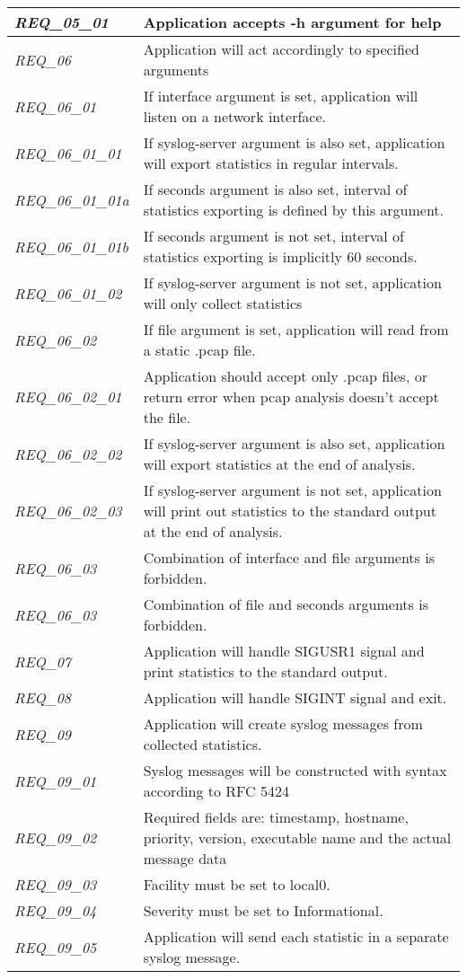 \begin{table}[H]
{\begin{tabular}{@{}|l|l|@{}}
\textit{REQ\_05\_01} & Application accepts -h argument for help \\ \midrule
\textit{REQ\_06} & Application will act accordingly to specified arguments \\ \midrule
\textit{REQ\_06\_01} & If interface argument is set, application will listen on a network interface. \\ \midrule
\textit{REQ\_06\_01\_01} & If syslog-server argument is also set, application will export statistics in regular intervals. \\ \midrule
\textit{REQ\_06\_01\_01a} & If seconds argument is also set, interval of statistics exporting is defined by this argument. \\ \midrule
\textit{REQ\_06\_01\_01b} & If seconds argument is not set, interval of statistics exporting is implicitly 60 seconds. \\ \midrule
\textit{REQ\_06\_01\_02} & If syslog-server argument is not set, application will only collect statistics \\ \midrule
\textit{REQ\_06\_02} & If file argument is set, application will read from a static .pcap file. \\ \midrule
\textit{REQ\_06\_02\_01} & Application should accept only .pcap files, or return error when pcap analysis doesn't accept the file. \\ \midrule
\textit{REQ\_06\_02\_02} & If syslog-server argument is also set, application will export statistics at the end of analysis. \\ \midrule
\textit{REQ\_06\_02\_03} & If syslog-server argument is not set, application will print out statistics to the standard output at the end of analysis. \\ \midrule
\textit{REQ\_06\_03} & Combination of interface and file arguments is forbidden. \\ \midrule
\textit{REQ\_06\_03} & Combination of file and seconds arguments is forbidden. \\ \midrule
\textit{REQ\_07} & Application will handle SIGUSR1 signal and print statistics to the standard output. \\ \midrule
\textit{REQ\_08} & Application will handle SIGINT signal and exit. \\ \midrule
\textit{REQ\_09} & Application will create syslog messages from collected statistics. \\ \midrule
\textit{REQ\_09\_01} & Syslog messages will be constructed with syntax according to RFC 5424 \\ \midrule
\textit{REQ\_09\_02} & Required fields are: timestamp, hostname, priority, version, executable name and the actual message data \\ \midrule
\textit{REQ\_09\_03} & Facility must be set to local0. \\ \midrule
\textit{REQ\_09\_04} & Severity must be set to Informational. \\ \midrule
\textit{REQ\_09\_05} & Application will send each statistic in a separate syslog message. \\ \midrule
\end{tabular}%
}
\end{table}

